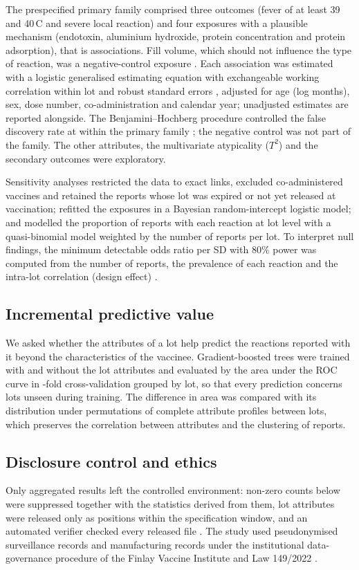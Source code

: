\documentclass[11pt]{article}
\begin{document}
The prespecified primary family comprised three outcomes (fever of at least 39 and
40\,\textdegree{}C and severe local reaction) and four exposures with a plausible mechanism
(endotoxin, aluminium hydroxide, protein concentration and protein adsorption), that is
\PTNPrimaryTests{} associations. Fill volume, which should not influence the type of reaction, was
a negative-control exposure \cite{Lipsitch2010,Arnold2016}. Each association was estimated with a
logistic generalised estimating equation with exchangeable working correlation within lot and
robust standard errors \cite{Liang1986,Zeger1986}, adjusted for age (log months), sex, dose number,
co-administration and calendar year; unadjusted estimates are reported alongside. The Benjamini--Hochberg procedure controlled the false
discovery rate at \PTFDRAlpha{} within the primary family \cite{Benjamini1995}; the negative control
was not part of the family. The other attributes, the multivariate atypicality ($T^2$) and the
secondary outcomes were exploratory.

Sensitivity analyses restricted the data to exact links, excluded co-administered vaccines and
retained the reports whose lot was expired or not yet released at vaccination; refitted the exposures in a Bayesian random-intercept
logistic model; and modelled the proportion of reports with each reaction at lot level with a
quasi-binomial model weighted by the number of reports per lot. To interpret null findings, the
minimum detectable odds ratio per SD with 80\% power was computed from the number of reports, the
prevalence of each reaction and the intra-lot correlation (design effect) \cite{Hsieh1998}.

\subsection{Incremental predictive value}\label{sec:m-ml}
We asked whether the attributes of a lot help predict the reactions reported with it beyond the
characteristics of the vaccinee. Gradient-boosted trees \cite{Ke2017} were trained with and without
the lot attributes and evaluated by the area under the ROC curve in \PTCVFolds-fold cross-validation
grouped by lot, so that every prediction concerns lots unseen during training. The difference in
area was compared with its distribution under \PTNPermutations{} permutations of complete attribute
profiles between lots, which preserves the correlation between attributes and the clustering of
reports.

\subsection{Disclosure control and ethics}\label{sec:m-sdc}
Only aggregated results left the controlled environment: non-zero counts below \VMinCell{} were
suppressed together with the statistics derived from them, lot attributes were released only as
positions within the specification window, and an automated verifier checked every released file
\cite{Hundepool2012}. The study used pseudonymised surveillance records and manufacturing records
under the institutional data-governance procedure of the Finlay Vaccine Institute and Law 149/2022
\cite{Ley149}.
\end{document}
